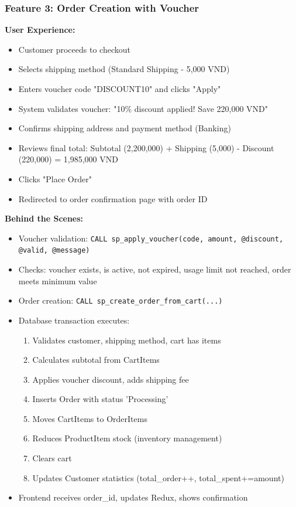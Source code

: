 \subsubsection{Feature 3: Order Creation with Voucher}

\textbf{User Experience:}
\begin{itemize}
    \item Customer proceeds to checkout
    \item Selects shipping method (Standard Shipping - 5,000 VND)
    \item Enters voucher code "DISCOUNT10" and clicks "Apply"
    \item System validates voucher: "10\% discount applied! Save 220,000 VND"
    \item Confirms shipping address and payment method (Banking)
    \item Reviews final total: Subtotal (2,200,000) + Shipping (5,000) - Discount (220,000) = 1,985,000 VND
    \item Clicks "Place Order"
    \item Redirected to order confirmation page with order ID
\end{itemize}

\textbf{Behind the Scenes:}
\begin{itemize}
    \item Voucher validation: \texttt{CALL sp\_apply\_voucher(code, amount, @discount, @valid, @message)}
    \item Checks: voucher exists, is active, not expired, usage limit not reached, order meets minimum value
    \item Order creation: \texttt{CALL sp\_create\_order\_from\_cart(...)}
    \item Database transaction executes:
    \begin{enumerate}
        \item Validates customer, shipping method, cart has items
        \item Calculates subtotal from CartItems
        \item Applies voucher discount, adds shipping fee
        \item Inserts Order with status 'Processing'
        \item Moves CartItems to OrderItems
        \item Reduces ProductItem stock (inventory management)
        \item Clears cart
        \item Updates Customer statistics (total\_order++, total\_spent+=amount)
    \end{enumerate}
    \item Frontend receives order\_id, updates Redux, shows confirmation
\end{itemize}

